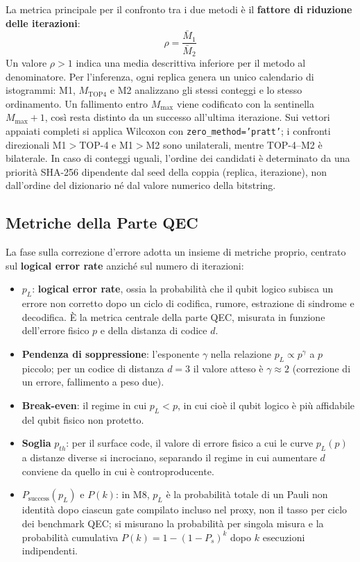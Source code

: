 \begin{onehalfspace}
La metrica principale per il confronto tra i due metodi è il \textbf{fattore di riduzione delle iterazioni}:
\begin{equation}
    \rho = \frac{\bar{M}_1}{\bar{M}_2}
    \label{eq:fattore_riduzione}
\end{equation}
 Un valore $\rho > 1$ indica una media descrittiva inferiore per il metodo al denominatore. Per l'inferenza, ogni replica genera un unico calendario di istogrammi: M1, $M_{\text{TOP4}}$ e M2 analizzano gli stessi conteggi e lo stesso ordinamento. Un fallimento entro $M_{\max}$ viene codificato con la sentinella $M_{\max}+1$, così resta distinto da un successo all'ultima iterazione. Sui vettori appaiati completi si applica Wilcoxon con \texttt{zero\_method='pratt'}; i confronti direzionali M1$>$TOP-4 e M1$>$M2 sono unilaterali, mentre TOP-4--M2 è bilaterale. In caso di conteggi uguali, l'ordine dei candidati è determinato da una priorità SHA-256 dipendente dal seed della coppia (replica, iterazione), non dall'ordine del dizionario né dal valore numerico della bitstring.

\subsection{Metriche della Parte QEC}
\label{subsec:metriche_qec}

La fase sulla correzione d'errore adotta un insieme di metriche proprio, centrato sul \textbf{logical error rate} anziché sul numero di iterazioni:

\begin{itemize}
    \item $p_L$: \textbf{logical error rate}, ossia la probabilità che il qubit logico subisca un errore non corretto dopo un ciclo di codifica, rumore, estrazione di sindrome e decodifica. È la metrica centrale della parte QEC, misurata in funzione dell'errore fisico $p$ e della distanza di codice $d$.
    \item \textbf{Pendenza di soppressione}: l'esponente $\gamma$ nella relazione $p_L \propto p^{\gamma}$ a $p$ piccolo; per un codice di distanza $d=3$ il valore atteso è $\gamma \approx 2$ (correzione di un errore, fallimento a peso due).
    \item \textbf{Break-even}: il regime in cui $p_L < p$, in cui cioè il qubit logico è più affidabile del qubit fisico non protetto.
    \item \textbf{Soglia} $p_{th}$: per il surface code, il valore di errore fisico a cui le curve $p_L(p)$ a distanze diverse si incrociano, separando il regime in cui aumentare $d$ conviene da quello in cui è controproducente.
    \item $P_{\text{success}}(p_L)$ e $P(k)$: in M8, $p_L$ è la probabilità totale di un Pauli non identità dopo ciascun gate compilato incluso nel proxy, non il tasso per ciclo dei benchmark QEC; si misurano la probabilità per singola misura e la probabilità cumulativa $P(k) = 1 - (1-P_s)^k$ dopo $k$ esecuzioni indipendenti.
\end{itemize}


\end{onehalfspace}
